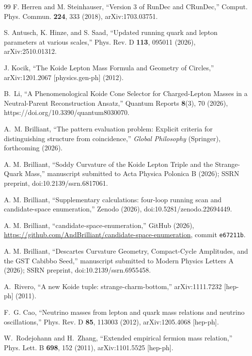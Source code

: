 \documentclass[aps,twocolumn,superscriptaddress,nofootinbib,floatfix]{revtex4-2}
\begin{document}
\begin{thebibliography}{99}
F. Herren and M. Steinhauser, ``Version 3 of RunDec and CRunDec,'' Comput. Phys. Commun. \textbf{224}, 333 (2018), arXiv:1703.03751.

S. Antusch, K. Hinze, and S. Saad, ``Updated running quark and lepton parameters at various scales,'' Phys. Rev. D \textbf{113}, 095011 (2026), arXiv:2510.01312.

J. Kocik, ``The Koide Lepton Mass Formula and Geometry of Circles,'' arXiv:1201.2067 [physics.gen-ph] (2012).

B.~Li, ``A Phenomenological Koide Cone Selector for Charged-Lepton Masses in a Neutral-Parent Reconstruction Ansatz,'' Quantum Reports \textbf{8}(3), 70 (2026), https://doi.org/10.3390/quantum8030070.

A.~M. Brilliant, ``The pattern evaluation problem: Explicit criteria for distinguishing structure from coincidence,'' \textit{Global Philosophy} (Springer), forthcoming (2026).

A. M. Brilliant, ``Soddy Curvature of the Koide Lepton Triple and the Strange-Quark Mass,'' manuscript submitted to Acta Physica Polonica B (2026); SSRN preprint, doi:10.2139/ssrn.6817061.

A. M. Brilliant, ``Supplementary calculations: four-loop running scan and candidate-space enumeration,'' Zenodo (2026), doi:10.5281/zenodo.22694449.

A. M. Brilliant, ``candidate-space-enumeration,'' GitHub (2026),
\url{https://github.com/AndBrilliant/candidate-space-enumeration},
commit \texttt{e67211b}.

A. M. Brilliant, ``Descartes Curvature Geometry, Compact-Cycle Amplitudes, and the GST Cabibbo Seed,'' manuscript submitted to Modern Physics Letters A (2026); SSRN preprint, doi:10.2139/ssrn.6955458.

A.~Rivero, ``A new Koide tuple: strange-charm-bottom,'' arXiv:1111.7232 [hep-ph] (2011).

F.~G. Cao, ``Neutrino masses from lepton and quark mass relations and neutrino oscillations,'' Phys. Rev. D \textbf{85}, 113003 (2012), arXiv:1205.4068 [hep-ph].

W.~Rodejohann and H.~Zhang, ``Extended empirical fermion mass relation,'' Phys. Lett. B \textbf{698}, 152 (2011), arXiv:1101.5525 [hep-ph].


\end{thebibliography}
\end{document}
